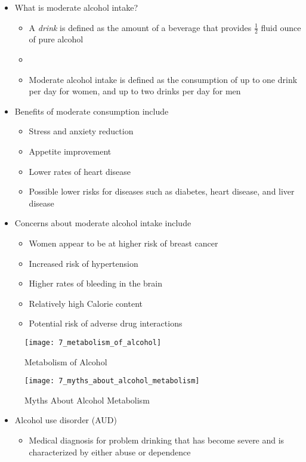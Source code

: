 \documentclass[title={Chapter 7}]{fdsn201notes}
\begin{document}
\begin{itemize}
	\item What is moderate alcohol intake?
	\begin{itemize}
		\item A \emph{drink} is defined as the amount of a beverage that provides $\frac{1}{2}$ fluid ounce of pure alcohol
		\item {}
		\item Moderate alcohol intake is defined as the consumption of up to one drink per day for women, and up to two drinks per day for men
	\end{itemize}
	\item Benefits of moderate consumption include
	\begin{itemize}
		\item Stress and anxiety reduction
		\item Appetite improvement
		\item Lower rates of heart disease
		\item Possible lower risks for diseases such as diabetes, heart disease, and liver disease
	\end{itemize}
	\item Concerns about moderate alcohol intake include
	\begin{itemize}
		\item Women appear to be at higher risk of breast cancer
		\item Increased risk of hypertension
		\item Higher rates of bleeding in the brain
		\item Relatively high Calorie content
		\item Potential risk of adverse drug interactions
	\end{itemize}
\end{itemize}

\begin{figure}[H]
	\centering
	\texttt{[image: 7\_metabolism\_of\_alcohol]}
	\caption{Metabolism of Alcohol}
	\label{fig:metabolism_of_alcohol}
\end{figure}

\begin{figure}[H]
	\centering
	\texttt{[image: 7\_myths\_about\_alcohol\_metabolism]}
	\caption{Myths About Alcohol Metabolism}
	\label{fig:myths_about_alcohol_metabolism}
\end{figure}

\begin{itemize}
	\item Alcohol use disorder (AUD)
	\begin{itemize}
		\item Medical diagnosis for problem drinking that has become severe and is characterized by either abuse or dependence
	\end{itemize}
\end{itemize}
\end{document}

